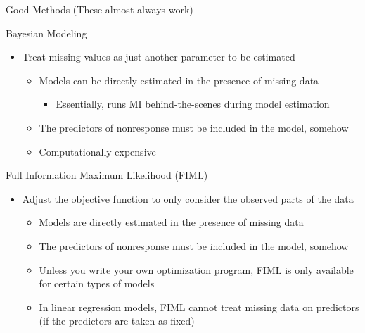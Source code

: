 \documentclass{beamer}\usepackage[]{graphicx}\usepackage[]{color}
\begin{document}
\watermarkon %

\begin{frame}[allowframebreaks]{Good Methods (These almost always work)}

  Bayesian Modeling
  \vc
  \begin{itemize}
  \item Treat missing values as just another parameter to be estimated
    \vc
    \begin{itemize}
    \item Models can be directly estimated in the presence of missing data
      \begin{itemize}
      \item Essentially, runs MI behind-the-scenes during model estimation
      \end{itemize}
      \vc
    \item The predictors of nonresponse must be included in the model, somehow
      \vc
    \item Computationally expensive
    \end{itemize}
  \end{itemize}
  
  \pagebreak
  
  Full Information Maximum Likelihood (FIML)
  \vc
  \begin{itemize} 
  \item Adjust the objective function to only consider the observed parts of the 
    data
    \vc
    \begin{itemize}
    \item Models are directly estimated in the presence of missing data
      \vc
    \item The predictors of nonresponse must be included in the model, somehow
      \vc
    \item Unless you write your own optimization program, FIML is only available 
      for certain types of models
      \vc
    \item In linear regression models, FIML cannot treat missing data on 
      predictors (if the predictors are taken as fixed)
    \end{itemize}
  \end{itemize}
  
\end{frame}

\end{document}
